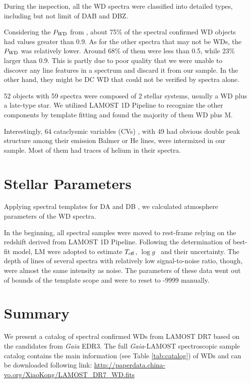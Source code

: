 \documentclass{aastex631}
\begin{document}
During the inspection, all the WD spectra were classified into detailed types, including but not limit of DAB and DBZ.

Considering the $P_{\rm WD}$ from \cite{2021arXiv210607669G}, about 75\% of the spectral confirmed WD objects had values greater than 0.9.
As for the other spectra that may not be WDs, the $P_{\rm WD}$ was relatively lower.
Around 68\% of them were less than 0.5, while 23\% larger than 0.9.
This is partly due to poor quality that we were unable to discover any line features in a spectrum and discard it from our sample.
In the other hand, they might be DC WD that could not be verified by spectra alone.

52 objects with 59 spectra were composed of 2 stellar systems, usually a WD plus a late-type star.
We utilized LAMOST 1D Pipeline to recognize the other components by template fitting and found the majority of them WD plus M.

Interestingly, 64 cataclysmic variables (CVs) \citep{1995cvs..book.....W}, with 49 had obvious double peak structure among their emission Balmer or He lines, were intermixed in our sample.
Most of them had traces of helium in their spectra.


\section{Stellar Parameters} \label{sec:param}

Applying spectral templates for DA and DB \citep{2010MmSAI..81..921K}, we calculated atmosphere parameters of the WD spectra.

In the beginning, all spectral samples were moved to rest-frame relying on the redshift derived from LAMOST 1D Pipeline.
Following the determination of best-fit model, LM  were adopted to estimate $T_{\rm eff}$, $\log g$ ~and their uncertainty.
The depth of lines of several spectra with relatively low signal-to-noise ratio, though, were almost the same intensity as noise.
The parameters of these data went out of bounds of the template scope and were to reset to -9999 manually.


\section{Summary}

We present a catalog of spectral confirmed WDs from LAMOST DR7 based on the candidates from {\it Gaia} EDR3.
The full {\it Gaia}-LAMOST spectroscopic sample catalog contains the main information (see Table \ref{tab:catalog}) of WDs and can be downloaded following link: \url{http://paperdata.china-vo.org/XiaoKong/LAMOST_DR7_WD.fits}
\end{document}
